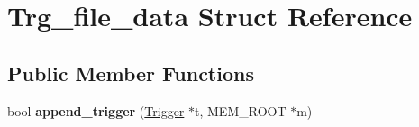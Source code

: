 \hypertarget{structTrg__file__data}{}\section{Trg\+\_\+file\+\_\+data Struct Reference}
\label{structTrg__file__data}
\subsection*{Public Member Functions}
\begin{DoxyCompactItemize}
\item 
\mbox{\label{structTrg__file__data_aed414e290cbc9af072290e01d5f058a4}} 
bool {\bfseries append\+\_\+trigger} (\mbox{\hyperlink{classTrigger}{Trigger}} $\ast$t, M\+E\+M\+\_\+\+R\+O\+OT $\ast$m)
\end{DoxyCompactItemize}
